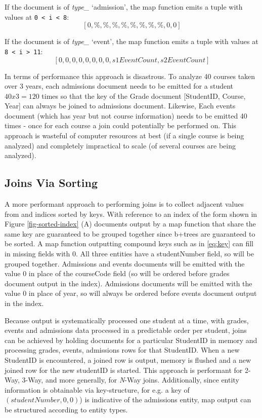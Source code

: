 If the document is of \textit{type\_} `admission', the map function emits a tuple with values at \texttt{0 < i < 8}: \[[0, \%, \%, \%, \%, \%, \%, \%, \%, 0, 0]\]

If the document is of \textit{type\_} ‘event’, the map function emits a tuple with values at \texttt{8 < i > 11}: \[[0, 0, 0, 0, 0, 0, 0, 0, s1EventCount, s2EventCount]\]

In terms of performance this approach is disastrous. To analyze 40 courses taken over 3 years, each admissions document needs to be emitted for a student $40 x 3 = 120$ times so that the key of the Grade document [StudentID, Course, Year] can always be joined to admissions document. Likewise, Each events document (which has year but not course information) needs to be emitted 40 times - once for each course a join could potentially be performed on. This approach is wasteful of computer resources at best (if a single course is being analyzed) and completely impractical to scale (of several courses are being analyzed).

\subsection{Joins Via Sorting}
A more performant approach to performing joins is to collect adjacent values from and indices sorted by keys. With reference to an index of the form shown in Figure \ref{fig-sorted-index} (A) documents output by a map function that share the same key are guaranteed to be grouped together since b+trees are guaranteed to be sorted. A map function outputting compound keys such as in \ref{eq:key} can fill in missing fields with $0$. All three entities have a studentNumber field, so will be grouped together. Admissions and events documents will be emitted with the value $0$ in place of the courseCode field (so will be ordered before grades document output in the index). Admissions documents will be emitted with the value $0$ in place of year, so will always be ordered before events document output in the index.

Because output is systematically processed one student at a time, with grades, events and admissions data processed in a predictable order per student, joins can be achieved by holding documents for a particular StudentID in memory and processing grades, events, admissions rows for that StudentID. When a new StudentID is encountered, a joined row is output, memory is flushed and a new joined row for the new studentID is started. This approach is performant for 2-Way, 3-Way, and more generally, for \textit{N}-Way joins. Additionally, since entity information is obtainable via key-structure, for e.g. a key of $(studentNumber,0,0)$) is indicative of the admissions entity, map output can be structured according to entity types.

